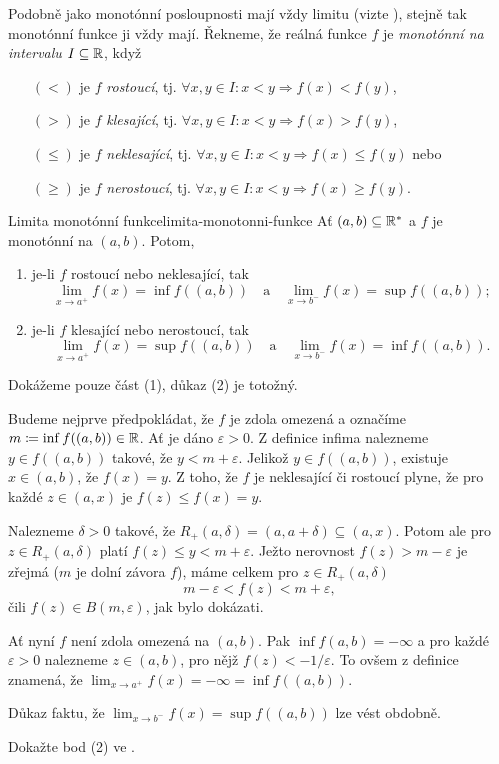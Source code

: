 Podobně jako monotónní posloupnosti mají vždy limitu (vizte
), stejně tak mono\-tónní funkce
ji vždy mají. Řekneme, že reálná funkce $f$ je \emph{monotónní na intervalu}
$I \subseteq \mathbb{R}$, když
\begin{itemize}
 \item[$(<)$] je $f$ \emph{rostoucí}, tj. $\forall x,y \in I: x<y \Rightarrow
  f(x)<f(y)$,
 \item[$(>)$] je $f$ \emph{klesající}, tj. $ \forall x,y \in I: x < y
  \Rightarrow f(x) > f(y)$,
 \item[$(\leq)$] je $f$ \emph{neklesající}, tj. $ \forall x,y \in I:x<y
  \Rightarrow f(x) \leq f(y)$ nebo
 \item[$(\geq)$] je $f$ \emph{nerostoucí}, tj. $ \forall x,y \in I:x<y
  \Rightarrow f(x) \geq f(y)$.
\end{itemize}
\begin{theorem}{Limita monotónní funkce}{limita-monotonni-funkce}
 Ať $(a,b) \subseteq \mathbb{R}^{*}$ a $f$ je monotónní na $(a,b)$. Potom,
 \begin{enumerate}
  \item je-li $f$ rostoucí nebo neklesající, tak
  \[
   \lim_{x \to a^{+}} f(x) = \inf f((a,b)) \quad \text{a} \quad \lim_{x \to
   b^{-}} f(x) = \sup f((a,b));
  \]
 \item je-li $f$ klesající nebo nerostoucí, tak
  \[
   \lim_{x \to a^{+}} f(x) = \sup f((a,b)) \quad \text{a} \quad \lim_{x \to
   b^{-}} f(x) = \inf f((a,b)).
  \]
 \end{enumerate}
\end{theorem}
\begin{thmproof}
 Dokážeme pouze část (1), důkaz (2) je totožný.

 Budeme nejprve předpokládat, že $f$ je zdola omezená a označíme $m \coloneqq
 \inf f((a,b)) \in \mathbb{R}$. Ať je dáno $\varepsilon>0$. Z definice infima nalezneme
 $y \in f((a,b))$ takové, že $y < m + \varepsilon$. Jelikož $y \in f((a,b))$,
 existuje $x \in (a,b)$, že $f(x) = y$. Z toho, že $f$ je neklesající či
 rostoucí plyne, že pro každé $z \in (a,x)$ je $f(z) \leq f(x) = y$.

 Nalezneme $\delta>0$ takové, že $R_+(a,\delta) = (a,a+\delta) \subseteq (a,x)$.
 Potom ale pro $z \in R_+(a,\delta)$ platí $f(z) \leq y < m+\varepsilon$. Ježto
 nerovnost $f(z) > m-\varepsilon$ je zřejmá ($m$ je dolní závora $f$), máme
 celkem pro $z \in R_+(a,\delta)$
 \[
  m -\varepsilon < f(z) < m + \varepsilon,
 \]
 čili $f(z) \in B(m,\varepsilon)$, jak bylo dokázati.

 Ať nyní $f$ není zdola omezená na $(a,b)$. Pak $\inf f(a,b) = -\infty$ a pro
 každé $\varepsilon>0$ nalezneme $z \in (a,b)$, pro nějž $f(z) < -1 /
 \varepsilon$. To ovšem z definice znamená, že $\lim_{x \to a^{+}} f(x) =
 -\infty = \inf f((a,b))$.

 Důkaz faktu, že $\lim_{x \to b^{-}} f(x) = \sup f((a,b))$ lze vést obdobně.
\end{thmproof}

\begin{exercise}{}{}
 Dokažte bod (2) ve .
\end{exercise}


